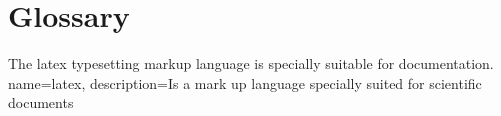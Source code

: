 \chapter{Glossary}

The \gls{latex} typesetting markup language is specially suitable
for documentation. \\

{
    name=latex,
    description={Is a mark up language specially suited
    for scientific documents}
}

\printglossaries
